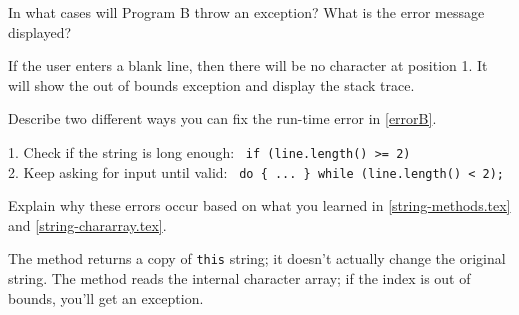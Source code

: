 %


\Q \label{errorB}
In what cases will Program B throw an exception? What is the error message displayed?

\begin{answer}
If the user enters a blank line, then there will be no character at position 1. It will show the out of bounds exception and display the stack trace.
\end{answer}


\Q Describe two different ways you can fix the run-time error in \ref{errorB}.

\begin{answer}
1. Check if the string is long enough: ~{\tt if (line.length() >= 2)} \\
2. Keep asking for input until valid: ~{\tt do \{~...~\} while (line.length() < 2);}
\end{answer}


\Q Explain why these errors occur based on what you learned in \ref{string-methods.tex} and \ref{string-chararray.tex}.

\begin{answer}
The  method returns a copy of {\tt this} string; it doesn't actually change the original string.
The  method reads the internal character array; if the index is out of bounds, you'll get an exception.
\end{answer}
